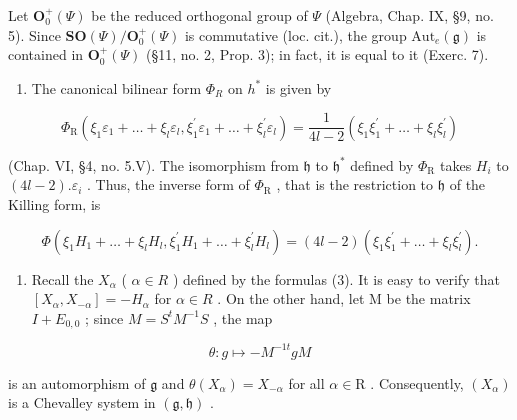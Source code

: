 Let \(\mathbf{O}_0^+(\varPsi)\) be the reduced orthogonal group of \(\varPsi\) (Algebra, Chap. IX, §9, no. 5). Since \(\mathbf{SO}(\varPsi)/\mathbf{O}_0^+(\varPsi)\) is commutative (loc. cit.), the group \(\mathrm{Aut}_e(\mathfrak{g})\) is contained in \(\mathbf{O}_0^+(\varPsi)\) (§11, no. 2, Prop. 3); in fact, it is equal to it (Exerc. 7).

\begin{enumerate}
\def\labelenumi{(\Roman{enumi})}
\setcounter{enumi}{7}
\tightlist
\item
  The canonical bilinear form \(\Phi_{R}\) on \(h^{*}\) is given by
\end{enumerate}

\[
\varPhi_ {\mathrm{R}} (\xi_ {1} \varepsilon_ {1} + \dots + \xi_ {l} \varepsilon_ {l}, \xi_ {1} ^ {\prime} \varepsilon_ {1} + \dots + \xi_ {l} ^ {\prime} \varepsilon_ {l}) = \frac {1}{4 l - 2} (\xi_ {1} \xi_ {1} ^ {\prime} + \dots + \xi_ {l} \xi_ {l} ^ {\prime})
\]

(Chap. VI, §4, no. 5.V). The isomorphism from \(\mathfrak{h}\) to \(\mathfrak{h}^*\) defined by \(\varPhi_{\mathrm{R}}\) takes \(H_{i}\) to \((4l - 2).\varepsilon_{i}\) . Thus, the inverse form of \(\varPhi_{\mathrm{R}}\) , that is the restriction to \(\mathfrak{h}\) of the Killing form, is

\[
\varPhi (\xi_ {1} H _ {1} + \dots + \xi_ {l} H _ {l}, \xi_ {1} ^ {\prime} H _ {1} + \dots + \xi_ {l} ^ {\prime} H _ {l}) = (4 l - 2) (\xi_ {1} \xi_ {1} ^ {\prime} + \dots + \xi_ {l} \xi_ {l} ^ {\prime}).
\]

\begin{enumerate}
\def\labelenumi{(\Roman{enumi})}
\setcounter{enumi}{8}
\tightlist
\item
  Recall the \(X_{\alpha}\) ( \(\alpha \in R\) ) defined by the formulas (3). It is easy to verify that \([X_{\alpha}, X_{-\alpha}] = -H_{\alpha}\) for \(\alpha \in R\) . On the other hand, let M be the matrix \(I + E_{0,0}\) ; since \(M = S^{t}M^{-1}S\) , the map
\end{enumerate}

\[
\theta : g \mapsto - M ^ {- 1 t} g M
\]

is an automorphism of \(\mathfrak{g}\) and \(\theta(X_{\alpha}) = X_{-\alpha}\) for all \(\alpha \in \mathrm{R}\) . Consequently, \((X_{\alpha})\) is a Chevalley system in \((\mathfrak{g},\mathfrak{h})\) .

